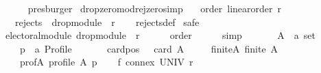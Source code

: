 \begin{isabellebody}
\ \ \ \ \isamarkupfalse%
\ presburger\isanewline
{}\isamarkupfalse%
%
\endisatagproof
{\isafoldproof}%
%
\isadelimproof
\isanewline
%
\endisadelimproof
\isanewline
{}\isamarkupfalse%
\ drop{\isacharunderscore}{\kern0pt}zero{\isacharunderscore}{\kern0pt}mod{\isacharunderscore}{\kern0pt}rej{\isacharunderscore}{\kern0pt}zero{\isacharbrackleft}{\kern0pt}simp{\isacharbrackright}{\kern0pt}{\isacharcolon}{\kern0pt}\isanewline
\ \ \ order{\isacharcolon}{\kern0pt}\ {\isachardoublequoteopen}linear{\isacharunderscore}{\kern0pt}order\ r{\isachardoublequoteclose}\isanewline
\ \ \ {\isachardoublequoteopen}rejects\ {}\ {\isacharparenleft}{\kern0pt}drop{\isacharunderscore}{\kern0pt}module\ {}\ r{\isacharparenright}{\kern0pt}{\isachardoublequoteclose}\isanewline
%
\isadelimproof
\ \ %
\endisadelimproof
%
\isatagproof
{}\isamarkupfalse%
\ rejects{\isacharunderscore}{\kern0pt}def\isanewline
{}\isamarkupfalse%
\ {\isacharparenleft}{\kern0pt}safe{\isacharparenright}{\kern0pt}\isanewline
\ \ \isamarkupfalse%
\ {\isachardoublequoteopen}electoral{\isacharunderscore}{\kern0pt}module\ {\isacharparenleft}{\kern0pt}drop{\isacharunderscore}{\kern0pt}module\ {}\ r{\isacharparenright}{\kern0pt}{\isachardoublequoteclose}\isanewline
\ \ \ \ \isamarkupfalse%
\ order\isanewline
\ \ \ \ \isamarkupfalse%
\ simp\isanewline
{}\isamarkupfalse%
\isanewline
\ \ \isamarkupfalse%
\isanewline
\ \ \ \ A\ {\isacharcolon}{\kern0pt}{\isacharcolon}{\kern0pt}\ {\isachardoublequoteopen}{\isacharprime}{\kern0pt}a\ set{\isachardoublequoteclose}\ \isanewline
\ \ \ \ p\ {\isacharcolon}{\kern0pt}{\isacharcolon}{\kern0pt}\ {\isachardoublequoteopen}{\isacharprime}{\kern0pt}a\ Profile{\isachardoublequoteclose}\isanewline
\ \ \isamarkupfalse%
\isanewline
\ \ \ \ card{\isacharunderscore}{\kern0pt}pos{\isacharcolon}{\kern0pt}\ {\isachardoublequoteopen}{}\ {\isasymle}\ card\ A{\isachardoublequoteclose}\ \isanewline
\ \ \ \ finite{\isacharunderscore}{\kern0pt}A{\isacharcolon}{\kern0pt}\ {\isachardoublequoteopen}finite\ A{\isachardoublequoteclose}\ \isanewline
\ \ \ \ prof{\isacharunderscore}{\kern0pt}A{\isacharcolon}{\kern0pt}\ {\isachardoublequoteopen}profile\ A\ p{\isachardoublequoteclose}\isanewline
\ \ \isamarkupfalse%
\ f{}{\isacharcolon}{\kern0pt}\ {\isachardoublequoteopen}connex\ UNIV\ r{\isachardoublequoteclose}\isanewline

\end{isabellebody}
